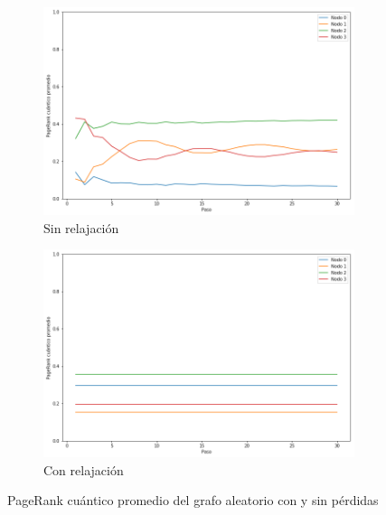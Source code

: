 \begin{figure}[H]
    \centering
    \begin{subfigure}[m]{0.45\textwidth}
        \centering
        \includegraphics[width=0.9\linewidth]{img/any-mean-lossless.png}
        \caption{Sin relajación}
    \end{subfigure}
    \begin{subfigure}[m]{0.45\textwidth}
        \centering
        \includegraphics[width=0.9\linewidth]{img/any-mean-lossy.png}
        \caption{Con relajación}
    \end{subfigure}
    \caption[PageRank cuántico promedio del grafo aleatorio con y sin pérdidas]{PageRank cuántico promedio del grafo aleatorio con y sin pérdidas}
    \label{fig:meananylossy}
\end{figure}



